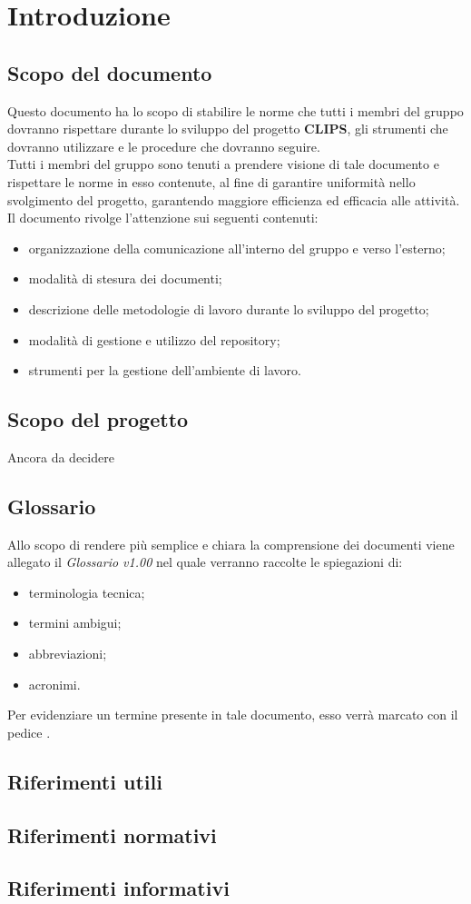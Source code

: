 \documentclass[../NormeProgetto.tex]{subfiles}
\begin{document}
\section{Introduzione}
	\subsection{Scopo del documento}
	Questo documento ha lo scopo di stabilire le norme che tutti i membri del gruppo \leaf dovranno rispettare durante lo sviluppo del progetto \textbf{CLIPS}, gli strumenti che dovranno utilizzare e le procedure che dovranno seguire. \\
	Tutti i membri del gruppo sono tenuti a prendere visione di tale documento e rispettare le norme in esso contenute, al fine di garantire uniformità nello svolgimento del progetto, garantendo maggiore efficienza ed efficacia alle attività. \\
	Il documento rivolge l'attenzione sui seguenti contenuti:
	\begin{itemize}
	\item organizzazione della comunicazione all'interno del gruppo e verso l'esterno;
	\item modalità di stesura dei documenti;
	\item descrizione delle metodologie di lavoro durante lo sviluppo del progetto;
	\item modalità di gestione e utilizzo del repository\g;
	\item strumenti per la gestione dell'ambiente di lavoro.
	\end{itemize}

	\subsection{Scopo del progetto}
	Ancora da decidere
	
	\subsection{Glossario}
	Allo scopo di rendere più semplice e chiara la comprensione dei documenti viene allegato il \textit{Glossario v1.00} nel quale verranno raccolte le spiegazioni di:
	\begin{itemize}
	\item terminologia tecnica;
	\item termini ambigui;
	\item abbreviazioni;
	\item acronimi.
	\end{itemize}
	Per evidenziare un termine presente in tale documento, esso verrà marcato con il pedice \g.
	
	\subsection{Riferimenti utili}

	\subsection{Riferimenti normativi}

	\subsection{Riferimenti informativi}
\end{document}
